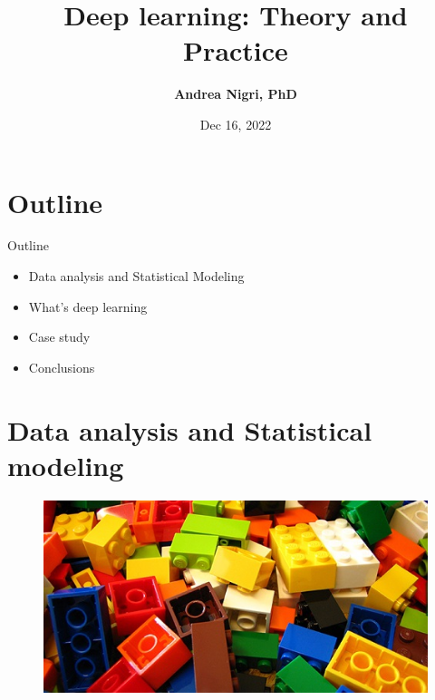 \documentclass[12pt]{beamer}
\title{\large Deep learning: Theory and Practice}
\author{\textbf{Andrea Nigri, PhD}}
\institute[A]{University of Foggia,	\\
 andrea.nigri@unifg.it}
\date{Dec 16, 2022}
\begin{document}
\maketitle

\section{Outline}
\begin{frame}{Outline}
	\begin{itemize}
		
		\item Data analysis and Statistical Modeling
		
		\item What's deep learning
		
		\item Case study
		
		
		\item Conclusions
		
	\end{itemize}
\end{frame}

\section{Data analysis and Statistical modeling}
\begin{frame}
\begin{figure}
		\centering
\includegraphics[width=.8\linewidth]{lego0}
\end{figure}
\end{frame}
\end{document}
